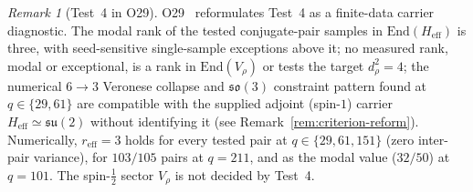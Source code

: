 \documentclass[12pt,a4paper]{article}
\theoremstyle{definition}
\theoremstyle{remark}
\newtheorem{remark}[theorem]{Remark}
\begin{document}
    \begin{remark}[Test~4 in O29]
      \label{rem:test4-numerical}
      O29~\cite{Beau2026a33} reformulates Test~4 as a finite-data carrier diagnostic.
      The modal rank of the tested conjugate-pair samples in $\mathrm{End}(H_{\mathrm{eff}})$ is three, with
      seed-sensitive single-sample exceptions above it; no measured rank, modal or exceptional, is a rank in
      $\mathrm{End}(V_\rho)$ or tests the target $d_\rho^2 = 4$; the numerical $6 \to 3$
      Veronese collapse and $\mathfrak{so}(3)$ constraint pattern found at $q \in \{29, 61\}$ are compatible with the
      supplied adjoint
      (spin-$1$) carrier $H_{\mathrm{eff}} \simeq \mathfrak{su}(2)$ without identifying it (see
      Remark~\ref{rem:criterion-reform}).
      Numerically, $r_{\mathrm{eff}} = 3$ holds for every tested pair at $q \in \{29, 61, 151\}$
      (zero inter-pair variance), for $103/105$ pairs at $q = 211$, and as the modal value ($32/50$)
      at $q = 101$.
      The spin-$\tfrac{1}{2}$ sector $V_\rho$ is not decided by Test~4.
    \end{remark}

    
    
\end{document}
